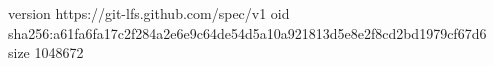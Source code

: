version https://git-lfs.github.com/spec/v1
oid sha256:a61fa6fa17c2f284a2e6e9c64de54d5a10a921813d5e8e2f8cd2bd1979cf67d6
size 1048672
